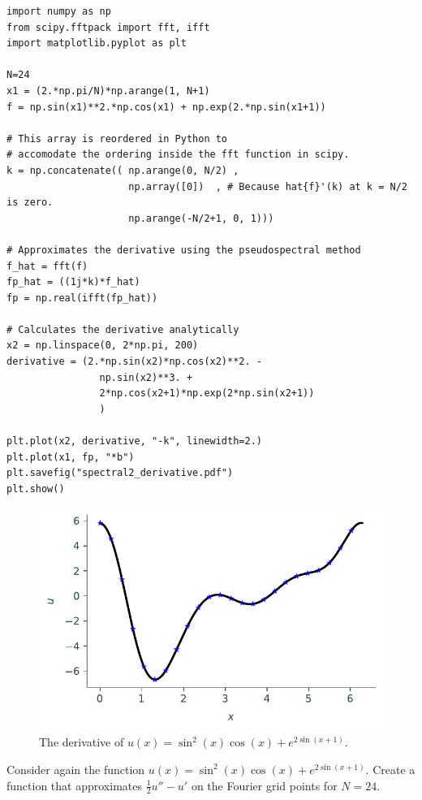 \begin{lstlisting}
import numpy as np
from scipy.fftpack import fft, ifft
import matplotlib.pyplot as plt

N=24
x1 = (2.*np.pi/N)*np.arange(1, N+1)
f = np.sin(x1)**2.*np.cos(x1) + np.exp(2.*np.sin(x1+1))

# This array is reordered in Python to
# accomodate the ordering inside the fft function in scipy.
k = np.concatenate(( np.arange(0, N/2) ,
					 np.array([0])	, # Because hat{f}'(k) at k = N/2 is zero.
					 np.arange(-N/2+1, 0, 1)))

# Approximates the derivative using the pseudospectral method
f_hat = fft(f)
fp_hat = ((1j*k)*f_hat)
fp = np.real(ifft(fp_hat))

# Calculates the derivative analytically
x2 = np.linspace(0, 2*np.pi, 200)
derivative = (2.*np.sin(x2)*np.cos(x2)**2. -
				np.sin(x2)**3. +
				2*np.cos(x2+1)*np.exp(2*np.sin(x2+1))
				)

plt.plot(x2, derivative, "-k", linewidth=2.)
plt.plot(x1, fp, "*b")
plt.savefig("spectral2_derivative.pdf")
plt.show()
\end{lstlisting}

\begin{figure}[H]
\centering
\includegraphics[width=\textwidth]{figures/spectral2_derivative_example.pdf}
\caption{The derivative of $u(x) = \sin^2 (x) \cos(x) +e^{2\sin(x+1)}$.}
\label{fig:spectral:spectral2_derivative}
\end{figure}

\begin{problem}
Consider again the function $u(x) = \sin^2 (x) \cos(x) +e^{2\sin(x+1)}$.
Create a function that approximates $\frac{1}{2}u''-u'$ on the Fourier grid points for $N=24$.
\end{problem}

